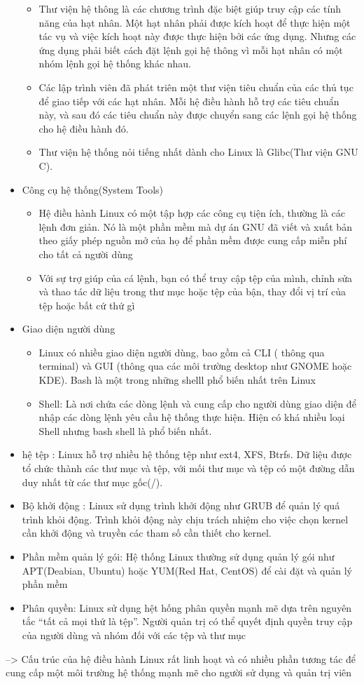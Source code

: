 \documentclass[12pt,a4paper]{article}
\begin{document}
\begin{itemize}
\begin{itemize}
		\item Thư viện hệ thông là các chương trình đặc biệt giúp truy cập các tính năng của hạt nhân. Một hạt nhân phải được kích hoạt để thực hiện một tác vụ và việc kích hoạt này được thực hiện bởi các ứng dụng. Nhưng các ứng dụng phải biết cách đặt lệnh gọi hệ thông vì mỗi hạt nhân có một nhóm lệnh gọi hệ thống khác nhau.
		\item Các lập trình viên đã phát triên một thư viện tiêu chuẩn của các thủ tục để giao tiếp với các hạt nhân. Mỗi hệ điều hành hỗ trợ các tiêu chuẩn này, và sau đó các tiêu chuẩn này được chuyển sang các lệnh gọi hệ thống cho hệ điều hành đó.
		\item Thư viện hệ thống nỏi tiếng nhất dành cho Linux là Glibc(Thư viện GNU C).
	\end{itemize}
	\item Công cụ hệ thống(System Tools)
	\begin{itemize}
		\item Hệ điều hành Linux có một tập hợp các công cụ tiện ích, thường là các lệnh đơn giản. Nó là một phần mềm mà dự án GNU đã viết và xuất bản theo giấy phép nguồn mở của họ để phần mềm được cung cấp miễn phí cho tất cả người dùng
		\item Với sự trợ giúp của cá lệnh, bạn có thể truy cập tệp của mình, chỉnh sửa và thao tác dữ liệu trong thư mục hoặc tệp của bận, thay đổi vị trí của tệp hoặc bất cứ thứ gì
	\end{itemize}
	\item Giao diện người dùng
	\begin{itemize}
		\item Linux có nhiều giao diện người dùng, bao gồm cả CLI ( thông qua terminal) và GUI (thông qua các môi trường desktop như GNOME hoặc KDE). Bash là một trong những shelll phổ biến nhất trên Linux
		\item Shell: Là nơi chứa các dòng lệnh và cung cấp cho người dùng giao diện để nhập các dòng lệnh yêu cầu hệ thống thực hiện. Hiện có khá nhiều loại Shell nhưng bash shell là phổ biến nhất.
	\end{itemize}
	\item hệ tệp : Linux hỗ trợ nhiều hệ thống tệp như ext4, XFS, Btrfs. Dữ liệu được tổ chức thành các thư mục và tệp, với mối thư mục và tệp có một đường dẫn duy nhất từ các thư mục gốc(/).
	\item Bộ khởi động : Linux sử dụng trình khởi động như GRUB để quản lý quá trình khỏi động. Trình khỏi động này chịu trách nhiệm cho việc chọn kernel cần khởi động và truyền các tham số cần thiết cho kernel.
	\item Phần mềm quản lý gói: Hệ thống Linux thường sử dụng quản lý gói như APT(Deabian, Ubuntu) hoặc YUM(Red Hat, CentOS) để cài đặt và quản lý phần mềm
	\item Phân quyền: Linux sử dụng hệt hống phân quyền mạnh mẽ dựa trên nguyên tắc “tất cả mọi thứ là tệp”. Người quản trị có thể quyết định quyền truy cập của người dùng và nhóm đối với các tệp và thư mục
\end{itemize}
--> Cấu trúc của hệ điều hành Linux rất linh hoạt và có nhiều phần tương tác để cung cấp một môi trường hệ thống mạnh mẽ cho người sử dụng và quản trị viên
\end{document}
